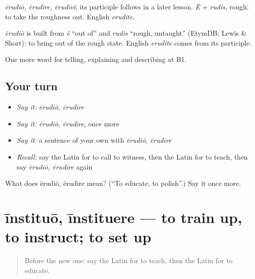 \emph{ērudiō, ērudīre, ērudīvī}; its participle follows in a later lesson. \emph{Ē} + \emph{rudis}, rough: to take the roughness out. English \emph{erudite}.

\begin{cousinweb}
\emph{ērudiō} is built from \emph{ē} \textquotedblleft{}out of\textquotedblright{} and \emph{rudis} \textquotedblleft{}rough, untaught\textquotedblright{} (EtymDB; Lewis \& Short): to bring out of the rough state. English \emph{erudite} comes from its participle.
\end{cousinweb}

\begin{grammarlens}[title={What you've built}]
One more word for telling, explaining and describing at B1.
\end{grammarlens}

\subsection*{Your turn}
\begin{itemize}
\raggedright
  \item \emph{Say it:} \emph{ērudiō, ērudīre}
  \item \emph{Say it:} \emph{ērudiō, ērudīre}, once more
  \item \emph{Say it:} a sentence of your own with \emph{ērudiō, ērudīre}
  \item \emph{Recall:} say the Latin for to call to witness, then the Latin for to teach, then say \emph{ērudiō, ērudīre} again
\end{itemize}

\begin{tcolorbox}[breakable,colback=teal!4,colframe=teal!35!black,title={Before you move on}]
What does ērudiō, ērudīre mean? (\textquotedblleft{}To educate, to polish\textquotedblright{}.) Say it once more.
\end{tcolorbox}
\section[īnstituō, īnstituere]{īnstituō, īnstituere — to train up, to instruct; to set up}

\label{lesson:LA-C400-instituo}



\begin{quote}
Before the new one: say the Latin for to teach, then the Latin for to educate.
\end{quote}

